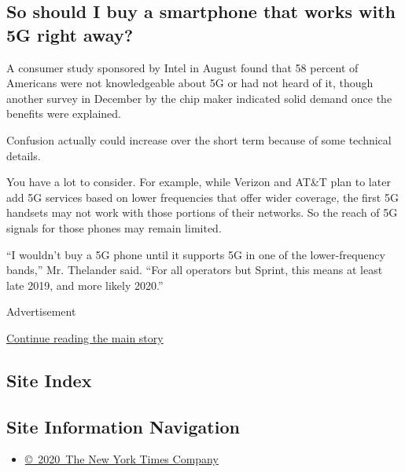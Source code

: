 \hypertarget{so-should-i-buy-a-smartphone-that-works-with-5g-right-away}{%
\subsection{So should I buy a smartphone that works with 5G right
away?}\label{so-should-i-buy-a-smartphone-that-works-with-5g-right-away}}

A consumer study sponsored by Intel in August found that 58 percent of
Americans were not knowledgeable about 5G or had not heard of it, though
another survey in December by the chip maker indicated solid demand once
the benefits were explained.

Confusion actually could increase over the short term because of some
technical details.

You have a lot to consider. For example, while Verizon and AT\&T plan to
later add 5G services based on lower frequencies that offer wider
coverage, the first 5G handsets may not work with those portions of
their networks. So the reach of 5G signals for those phones may remain
limited.

``I wouldn't buy a 5G phone until it supports 5G in one of the
lower-frequency bands,'' Mr. Thelander said. ``For all operators but
Sprint, this means at least late 2019, and more likely 2020.''

Advertisement

\protect\hyperlink{after-bottom}{Continue reading the main story}

\hypertarget{site-index}{%
\subsection{Site Index}\label{site-index}}

\hypertarget{site-information-navigation}{%
\subsection{Site Information
Navigation}\label{site-information-navigation}}

\begin{itemize}
\tightlist
\item
  \href{https://help.nytimes.com/hc/en-us/articles/115014792127-Copyright-notice}{©~2020~The
  New York Times Company}
\end{itemize}

